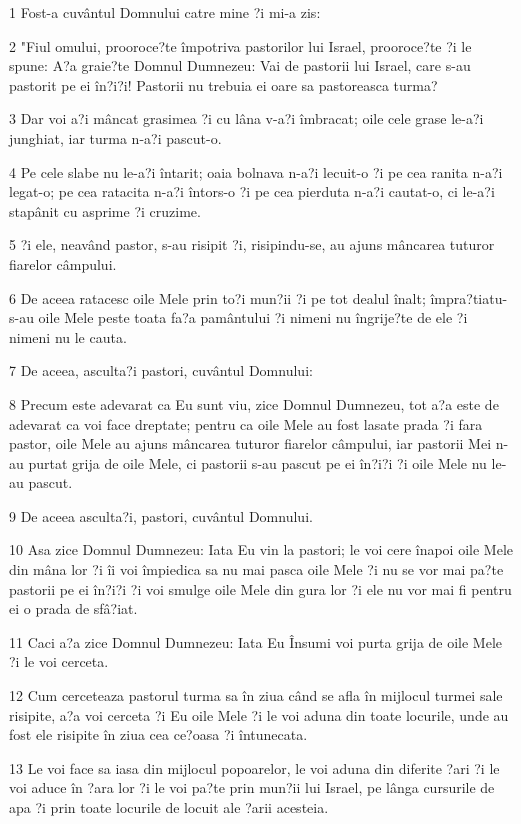 \par 1 Fost-a cuvântul Domnului catre mine ?i mi-a zis:
\par 2 "Fiul omului, prooroce?te împotriva pastorilor lui Israel, prooroce?te ?i le spune: A?a graie?te Domnul Dumnezeu: Vai de pastorii lui Israel, care s-au pastorit pe ei în?i?i! Pastorii nu trebuia ei oare sa pastoreasca turma?
\par 3 Dar voi a?i mâncat grasimea ?i cu lâna v-a?i îmbracat; oile cele grase le-a?i junghiat, iar turma n-a?i pascut-o.
\par 4 Pe cele slabe nu le-a?i întarit; oaia bolnava n-a?i lecuit-o ?i pe cea ranita n-a?i legat-o; pe cea ratacita n-a?i întors-o ?i pe cea pierduta n-a?i cautat-o, ci le-a?i stapânit cu asprime ?i cruzime.
\par 5 ?i ele, neavând pastor, s-au risipit ?i, risipindu-se, au ajuns mâncarea tuturor fiarelor câmpului.
\par 6 De aceea ratacesc oile Mele prin to?i mun?ii ?i pe tot dealul înalt; împra?tiatu-s-au oile Mele peste toata fa?a pamântului ?i nimeni nu îngrije?te de ele ?i nimeni nu le cauta.
\par 7 De aceea, asculta?i pastori, cuvântul Domnului:
\par 8 Precum este adevarat ca Eu sunt viu, zice Domnul Dumnezeu, tot a?a este de adevarat ca voi face dreptate; pentru ca oile Mele au fost lasate prada ?i fara pastor, oile Mele au ajuns mâncarea tuturor fiarelor câmpului, iar pastorii Mei n-au purtat grija de oile Mele, ci pastorii s-au pascut pe ei în?i?i ?i oile Mele nu le-au pascut.
\par 9 De aceea asculta?i, pastori, cuvântul Domnului.
\par 10 Asa zice Domnul Dumnezeu: Iata Eu vin la pastori; le voi cere înapoi oile Mele din mâna lor ?i îi voi împiedica sa nu mai pasca oile Mele ?i nu se vor mai pa?te pastorii pe ei în?i?i ?i voi smulge oile Mele din gura lor ?i ele nu vor mai fi pentru ei o prada de sfâ?iat.
\par 11 Caci a?a zice Domnul Dumnezeu: Iata Eu Însumi voi purta grija de oile Mele ?i le voi cerceta.
\par 12 Cum cerceteaza pastorul turma sa în ziua când se afla în mijlocul turmei sale risipite, a?a voi cerceta ?i Eu oile Mele ?i le voi aduna din toate locurile, unde au fost ele risipite în ziua cea ce?oasa ?i întunecata.
\par 13 Le voi face sa iasa din mijlocul popoarelor, le voi aduna din diferite ?ari ?i le voi aduce în ?ara lor ?i le voi pa?te prin mun?ii lui Israel, pe lânga cursurile de apa ?i prin toate locurile de locuit ale ?arii acesteia.
